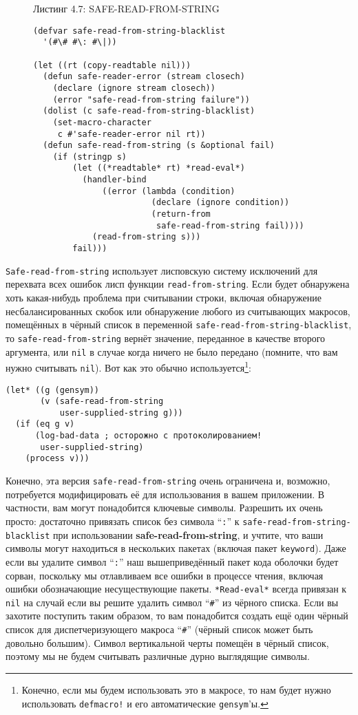 \begin{figure}Листинг 4.7: SAFE-READ-FROM-STRING\label{listing_4.7}
\listbegin
\begin{verbatim}
(defvar safe-read-from-string-blacklist
  '(#\# #\: #\|))

(let ((rt (copy-readtable nil)))
  (defun safe-reader-error (stream closech)
    (declare (ignore stream closech))
    (error "safe-read-from-string failure"))
  (dolist (c safe-read-from-string-blacklist)
    (set-macro-character
     c #'safe-reader-error nil rt))
  (defun safe-read-from-string (s &optional fail)
    (if (stringp s)
        (let ((*readtable* rt) *read-eval*)
          (handler-bind
              ((error (lambda (condition)
                        (declare (ignore condition))
                        (return-from
                         safe-read-from-string fail))))
            (read-from-string s)))
        fail)))
\end{verbatim}
\listend
\end{figure}

\verb"Safe-read-from-string" использует лисповскую систему исключений для перехвата всех ошибок лисп функции \verb"read-from-string". Если будет обнаружена хоть какая-нибудь проблема при считывании строки, включая обнаружение несбалансированных скобок или обнаружение любого из считывающих макросов, помещённых в чёрный список в переменной \verb"safe-read-from-string-blacklist", то \verb"safe-read-from-string" вернёт значение, переданное в качестве второго аргумента, или \verb"nil" в случае когда ничего не было передано (помните, что вам нужно считывать \verb"nil"). Вот как это обычно используется\footnote{Конечно, если мы будем использовать это в макросе, то нам будет нужно использовать \verb"defmacro!" и его автоматические \verb"gensym"'ы.}:

\begin{verbatim}
(let* ((g (gensym))
       (v (safe-read-from-string
           user-supplied-string g)))
  (if (eq g v)
      (log-bad-data ; осторожно с протоколированием!
       user-supplied-string)
    (process v)))
\end{verbatim}

Конечно, эта версия \verb"safe-read-from-string" очень ограничена и, возможно, потребуется модифицировать её для использования в вашем приложении. В частности, вам могут понадобится ключевые символы. Разрешить их очень просто: достаточно привязать список без символа ``\verb":"'' к \verb"safe-read-from-string-blacklist" при использовании \textbf{sa\-fe-re\-ad-fro\-m-stri\-ng}, и учтите, что ваши символы могут находиться в нескольких пакетах (включая пакет \verb"keyword"). Даже если вы удалите символ ``\verb":"'' наш вышеприведённый пакет кода оболочки будет сорван, поскольку мы отлавливаем все ошибки в процессе чтения, включая ошибки обозначающие несуществующие пакеты. \verb"*Read-eval*" всегда привязан к \verb"nil" на случай если вы решите удалить символ ``\verb"#"'' из чёрного списка. Если вы захотите поступить таким образом, то вам понадобится создать ещё один чёрный список для диспетчеризующего макроса ``\verb"#"'' (чёрный список может быть довольно большим). Символ вертикальной черты помещён в чёрный список, поэтому мы не будем считывать различные дурно выглядящие символы.

